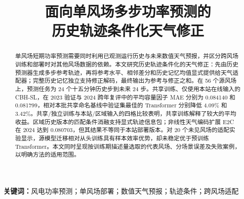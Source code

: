 \documentclass[UTF8,11pt,letterpaper,fontset=fandol]{ctexart}
\title{面向单风场多步功率预测的\\历史轨迹条件化天气修正}
\author{}
\date{}
\begin{document}
\maketitle
\begin{abstract}
单风场短期功率预测需要同时利用已观测运行历史与未来数值天气预报，并区分跨风场训练和部署时对其他风场数据的依赖。本文研究历史轨迹条件化的天气修正：先由历史预测器生成多步参考轨迹，再将参考水平、相邻差分和历史记忆均值显式提供给天气适配器；完整历史记忆独立支持修正解码，最终输出为参考与修正之和。在 56 个源风场上，预测任务为 24 个十五分钟历史步到未来 24 步。共享训练、仅使用本站在线输入的 CBH-SL，在 2023 验证与 2024 跨年复评中的平均容量因子 MAE 分别为 0.084140 和 0.081799，相对本批共享命名基线中验证集最佳的 Transformer 分别降低 4.09\% 和 3.42\%。共享/独立训练与本站/区域输入的四格比较表明，共享训练解释了较大的平均收益。区域历史版本的匹配条件消融支持显式轨迹信息包；非线性天气编码扩展 E2C 在 2024 达到 0.080703，但其结果不等同于本站部署版本。对 20 个未见风场的适配实验显示，源模型迁移相对从头训练具有样本效率优势，却未稳定优于预训练 Transformer。本文同时呈现按训练期描述量选取的代表风场、分场景误差及失败案例，以明确方法的适用范围。
\end{abstract}
\noindent\textbf{关键词：}风电功率预测；单风场部署；数值天气预报；轨迹条件；跨风场适配




\clearpage
\appendix

\end{document}
